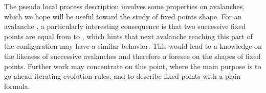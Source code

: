 \documentclass[11pt,a4paper]{llncs}
\begin{document}
The pseudo local process description involves some properties on avalanches, which we hope will be useful toward the study of fixed points shape. For an avalanche , a particularly interesting consequence is that two successive fixed points are equal from  to , which hints that next avalanche reaching this part of the configuration may have a similar behavior. This would lead to a knowledge on the likeness of successive avalanches and therefore a foresee on the shapes of fixed points. Further work may concentrate on this point, where the main purpose is to go ahead iterating evolution rules, and to describe fixed points with a plain formula.



\end{document}
